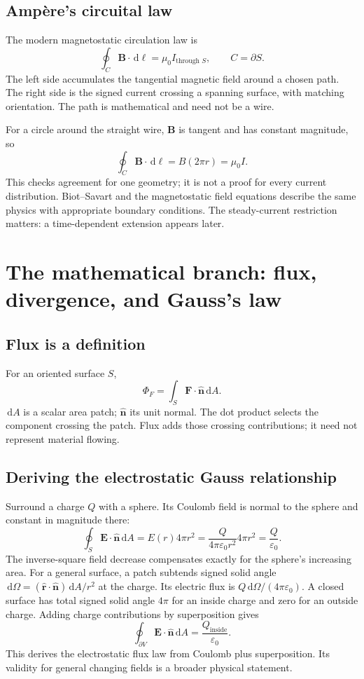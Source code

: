 \documentclass[11pt,letterpaper]{article}
\newcommand{\vect}[1]{\boldsymbol{#1}}
\newcommand{\dd}{\,\mathrm d}
\begin{document}
\subsection*{Amp\`ere's circuital law}
The modern magnetostatic circulation law is
\begin{equation}
\oint_C\vect B\cdot\dd\vect\ell=\mu_0I_{\text{through }S},
\qquad C=\partial S.
\end{equation}
The left side accumulates the tangential magnetic field around a chosen path. The right side is the signed current crossing a spanning surface, with matching orientation. The path is mathematical and need not be a wire.\cite{ampere}

For a circle around the straight wire, $\vect B$ is tangent and has constant magnitude, so
\[
\oint_C\vect B\cdot\dd\vect\ell=B(2\pi r)=\mu_0I.
\]
This checks agreement for one geometry; it is not a proof for every current distribution. Biot--Savart and the magnetostatic field equations describe the same physics with appropriate boundary conditions. The steady-current restriction matters: a time-dependent extension appears later.

\newpage
\section{The mathematical branch: flux, divergence, and Gauss's law}
\subsection*{Flux is a definition}
For an oriented surface $S$,
\begin{equation}
\Phi_F=\int_S\vect F\cdot\hat{\vect n}\dd A.
\end{equation}
$\dd A$ is a scalar area patch; $\hat{\vect n}$ its unit normal. The dot product selects the component crossing the patch. Flux adds those crossing contributions; it need not represent material flowing.

\subsection*{Deriving the electrostatic Gauss relationship}
Surround a charge $Q$ with a sphere. Its Coulomb field is normal to the sphere and constant in magnitude there:
\[
\oint_S\vect E\cdot\hat{\vect n}\dd A
=E(r)4\pi r^2
=\frac{Q}{4\pi\varepsilon_0r^2}4\pi r^2
=\frac{Q}{\varepsilon_0}.
\]
The inverse-square field decrease compensates exactly for the sphere's increasing area. For a general surface, a patch subtends signed solid angle $\dd\Omega=(\hat{\vect r}\cdot\hat{\vect n})\dd A/r^2$ at the charge. Its electric flux is $Q\dd\Omega/(4\pi\varepsilon_0)$. A closed surface has total signed solid angle $4\pi$ for an inside charge and zero for an outside charge. Adding charge contributions by superposition gives
\begin{equation}
\boxed{\oint_{\partial V}\vect E\cdot\hat{\vect n}\dd A
=\frac{Q_{\text{inside}}}{\varepsilon_0}.}
\end{equation}
This derives the electrostatic flux law from Coulomb plus superposition. Its validity for general changing fields is a broader physical statement.\cite{gauss}
\end{document}
